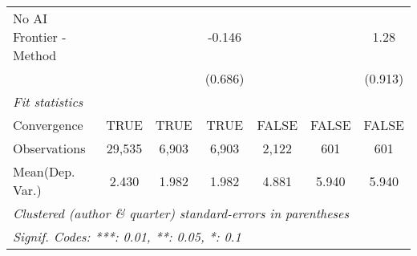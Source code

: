 \begin{tabular}{lcccccc}
   No AI Frontier - Method &         &               & -0.146        &               &               & 1.28\\   
                           &         &               & (0.686)       &               &               & (0.913)\\   
   \midrule
   \emph{Fit statistics}\\
   Convergence             &TRUE     & TRUE          & TRUE          & FALSE         & FALSE         & FALSE\\  
   Observations            & 29,535  & 6,903         & 6,903         & 2,122         & 601           & 601\\  
Mean(Dep. Var.) & 2.430 & 1.982 & 1.982 & 4.881 & 5.940 & 5.940 \\
   \midrule \midrule
   \multicolumn{7}{l}{\emph{Clustered (author \& quarter) standard-errors in parentheses}}\\
   \multicolumn{7}{l}{\emph{Signif. Codes: ***: 0.01, **: 0.05, *: 0.1}}\\
\end{tabular}
\par\endgroup
